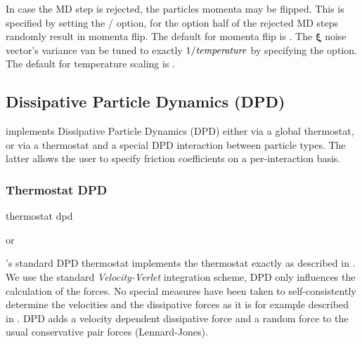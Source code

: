 In case the MD step is rejected, the particles momenta may be
flipped. This is specified by setting the  /
 option, for the  option half of the
rejected MD steps randomly result in momenta flip. The default for momenta
flip is . The $\pmb{\xi}$ noise vector's variance van be
tuned to exactly $1/\mathrm{\mathit{temperature}}$ by specifying the 
option. The default for temperature scaling is .


\subsection{Dissipative Particle Dynamics (DPD) } \label{sec:DPD}

\es implements Dissipative Particle Dynamics (DPD) either via a global
thermostat, or via a thermostat and a special DPD interaction between
particle types.  The latter allows the user to specify friction
coefficients on a per-interaction basis.

\subsubsection{Thermostat DPD}

\begin{pysyntax}
\end{pysyntax}

\begin{essyntax}
  thermostat dpd    
  \begin{features}
     or 
  \end{features}
\end{essyntax}

\es's standard DPD thermostat implements the thermostat exactly as
described in \cite{soddeman03a}.  We use the standard
\textit{Velocity-Verlet} integration scheme, \eg DPD only influences
the calculation of the forces. No special measures have been taken to
self-consistently determine the velocities and the dissipative forces
as it is for example described in \cite{Nikunen03}.  DPD adds a
velocity dependent dissipative force and a random force to the usual
conservative pair forces (\eg Lennard-Jones).

